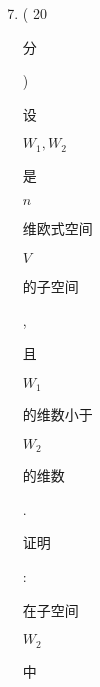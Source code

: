 \documentclass[10pt]{article}
\begin{document}
\begin{enumerate}
  \setcounter{enumi}{6}
  \item ( 20 \begin{CJK}{UTF8}{mj}分\end{CJK}) \begin{CJK}{UTF8}{mj}设\end{CJK} $W_{1}, W_{2}$ \begin{CJK}{UTF8}{mj}是\end{CJK} $n$ \begin{CJK}{UTF8}{mj}维欧式空间\end{CJK} $V$ \begin{CJK}{UTF8}{mj}的子空间\end{CJK}, \begin{CJK}{UTF8}{mj}且\end{CJK} $W_{1}$ \begin{CJK}{UTF8}{mj}的维数小于\end{CJK} $W_{2}$ \begin{CJK}{UTF8}{mj}的维数\end{CJK}. \begin{CJK}{UTF8}{mj}证明\end{CJK}: \begin{CJK}{UTF8}{mj}在子空间\end{CJK} $W_{2}$ \begin{CJK}{UTF8}{mj}中\end{CJK}
\end{enumerate}
\end{document}
